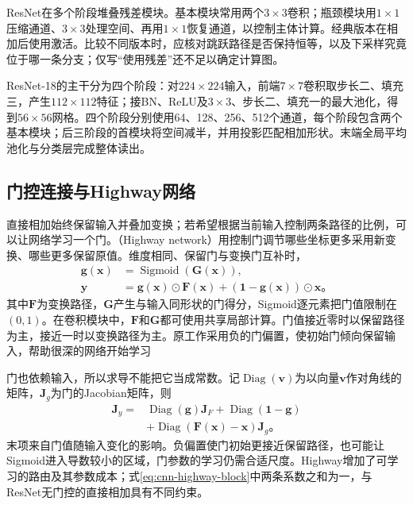 ResNet在多个阶段堆叠残差模块。基本模块常用两个$3\times3$卷积；瓶颈模块用$1\times1$压缩通道、$3\times3$处理空间、再用$1\times1$恢复通道，以控制主体计算。经典版本在相加后使用激活。比较不同版本时，应核对跳跃路径是否保持恒等，以及下采样究竟位于哪一条分支；仅写“使用残差”还不足以确定计算图。

ResNet-18的主干分为四个阶段：对$224\times224$输入，前端$7\times7$卷积取步长二、填充三，产生$112\times112$特征；接BN、ReLU及$3\times3$、步长二、填充一的最大池化，得到$56\times56$网格。四个阶段分别使用64、128、256、512个通道，每个阶段包含两个基本模块；后三阶段的首模块将空间减半，并用投影匹配相加形状。末端全局平均池化与分类层完成整体读出。

\subsection{门控连接与Highway网络}
\label{sec:cnn-highway}

直接相加始终保留输入并叠加变换；若希望根据当前输入控制两条路径的比例，可以让网络学习一个门。（Highway network）用控制门调节哪些坐标更多采用新变换、哪些更多保留原值。维度相同、保留门与变换门互补时，
\begin{equation}
  \begin{aligned}
    \bm g(\bm x)&=\operatorname{Sigmoid}(\bm G(\bm x)),\\
    \bm y&=\bm g(\bm x)\odot\bm F(\bm x)
            +(\bm1-\bm g(\bm x))\odot\bm x\text{。}
  \end{aligned}
  \label{eq:cnn-highway-block}
\end{equation}
其中$\bm F$为变换路径，$\bm G$产生与输入同形状的门得分，Sigmoid逐元素把门值限制在$(0,1)$。在卷积模块中，$\bm F$和$\bm G$都可使用共享局部计算。门值接近零时以保留路径为主，接近一时以变换路径为主。原工作采用负的门偏置，使初始门倾向保留输入，帮助很深的网络开始学习

门也依赖输入，所以求导不能把它当成常数。记$\operatorname{Diag}(\bm v)$为以向量$\bm v$作对角线的矩阵，$\bm J_g$为门的Jacobian矩阵，则
\begin{equation}
  \begin{aligned}
    \bm J_y={}&\operatorname{Diag}(\bm g)\bm J_F
      +\operatorname{Diag}(\bm1-\bm g)\\
      &+\operatorname{Diag}(\bm F(\bm x)-\bm x)\bm J_g\text{。}
  \end{aligned}
  \label{eq:cnn-highway-gradient}
\end{equation}
末项来自门值随输入变化的影响。负偏置使门初始更接近保留路径，也可能让Sigmoid进入导数较小的区域，门参数的学习仍需合适尺度。Highway增加了可学习的路由及其参数成本；式\eqref{eq:cnn-highway-block}中两条系数之和为一，与ResNet无门控的直接相加具有不同约束。

